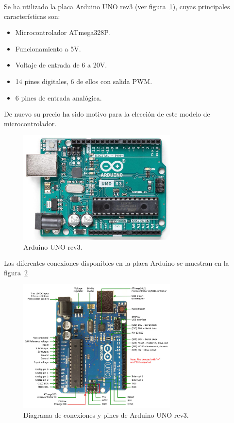 \documentclass[a4paper, 12pt, oneside]{book}
\begin{document}
Se ha utilizado la placa Arduino UNO rev3 (ver figura~\ref{figura:arduino}), cuyas principales características son:

\begin{itemize}
	\item Microcontrolador ATmega328P.
	
	\item Funcionamiento a 5V.
	
	\item Voltaje de entrada de 6 a 20V.
	
	\item 14 pines digitales, 6 de ellos con salida PWM.

	\item 6 pines de entrada analógica.
\end{itemize}

De nuevo su precio ha sido motivo para la elección de este modelo de microcontrolador.

\begin{figure}[H]
	\centering
    \includegraphics[width=8cm, keepaspectratio]{img/arduino}
    \caption{Arduino UNO rev3.}
    \label{figura:arduino}
\end{figure}

Las diferentes conexiones disponibles en la placa Arduino se muestran en la figura~\ref{figura:conexiones_arduino}

\begin{figure}[H]
	\centering
    \includegraphics[width=8cm, keepaspectratio]{img/conexiones_arduino}
    \caption{Diagrama de conexiones y pines de Arduino UNO rev3.}
    \label{figura:conexiones_arduino}
\end{figure}
\end{document}
